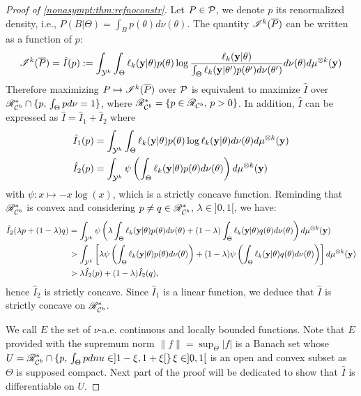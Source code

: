 \begin{proof}[Proof of \cref{nonasympt:thm:refnoconstr}]
    
    Let $P\in\mathcal{P}$, we denote $p$ its renormalized density, i.e., $P(B|\Theta)=\int_Bp(\theta)d\nu(\theta)$. 
    The quantity $\mathscr{I}^k(\overline{P})$ can be written as a function of $p$:
        \begin{equation}
        \mathscr{I}^k(\overline{P}) = \hat I(p) := \int_{\mathcal{Y}^k}\int_\Theta \ell_k(\mathbf{y}|\theta)p(\theta)\log\frac{\ell_k(\mathbf{y}|\theta)}{\int_\Theta \ell_k(\mathbf{y}|\theta') p(\theta')d\nu(\theta')}d\nu(\theta)d\mu^{\otimes k}(\mathbf{y})
    \end{equation}
Therefore maximizing $P\mapsto\mathscr{I}^k(\overline{P})$ over $\mathcal{P}$ is equivalent to maximize $\hat I$ over $\mathscr{R}_{\mathcal{C}^b}^\ast\cap\{p,\,\int_\Theta pd\nu=1\}$, where $\mathscr{R}^\ast_{\mathcal{C}^b}=\{p\in\mathscr{R}_{\mathcal{C}^b},\,p>0\}$. In addition, $\hat I$ can be expressed as $\hat I = \hat I_1 + \hat I_2$ where 
    \begin{align*}
        \hat I_1(p) &= \int_{\mathcal{Y}^k}\int_\Theta \ell_k(\mathbf{y}|\theta)p(\theta)\log \ell_k(\mathbf{y}|\theta)d\nu(\theta)d\mu^{\otimes k}(\mathbf{y})\\
        \hat I_2(p) &= \int_{\mathcal{Y}^k}\psi\left(\int_\Theta \ell_k(\mathbf{y}|\theta)p(\theta)d\nu(\theta)\right)d\mu^{\otimes k}(\mathbf{y})
    \end{align*}
with $\psi:x\mapsto-x\log(x)$, which is a strictly concave function. Reminding that $\mathscr{R}_{\mathcal{C}^b}^\ast$ is convex and considering $p\ne q\in\mathscr{R}_{\mathcal{C}^b}^\ast$, $\lambda\in]0,1[$, we have:
    \begin{align}\nonumber
        \hat I_2(\lambda p + (1-\lambda)q) &= \int_{\mathcal{Y}^k}\psi\left(\lambda\int_\Theta \ell_k(\mathbf{y}|\theta)p(\theta)d\nu(\theta) + (1-\lambda)\int_\Theta \ell_k(\mathbf{y}|\theta)q(\theta)d\nu(\theta)\right)d\mu^{\otimes k}(\mathbf{y})\\
            &>  \int_{\mathcal{Y}^k}\left[\lambda\psi\left(\int_\Theta \ell_k(\mathbf{y}|\theta)p(\theta)d\nu(\theta)\right) + (1-\lambda)\psi\left(\int_\Theta \ell_k(\mathbf{y}|\theta)q(\theta)d\nu(\theta)\right)\right]d\mu^{\otimes k}(\mathbf{y})\\
            &> \lambda\hat I_2(p)+(1-\lambda)\hat I_2(q), \nonumber                
    \end{align}
hence  $\hat I_2$ is strictly concave. Since $\hat I_1$ is a linear function, we deduce that $\hat I$ is strictly concave on $\mathscr{R}_{\mathcal{C}^b}^\ast$.

We call $E$ the set of $\nu$-a.e. continuous  and locally bounded functions.
Note that $E$ provided with the supremum  norm $\|f\|=\sup_\Theta|f|$ is a Banach set whose $U=\mathscr{R}_{\mathcal{C}^b}^\ast\cap\{p,\,\int_\Theta pdnu\in]1-\xi,1+\xi[\}\,\xi\in]0,1[$ is an open and convex subset as $\Theta$ is supposed compact. Next part of the proof will be dedicated to show that $\hat I$ is differentiable on $U$.%


\end{proof}
